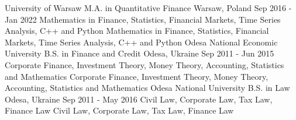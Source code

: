 
\cvexperience
  {University of Warsaw}
  {M.A. in Quantitative Finance}
  {Warsaw, Poland}
  {Sep 2016 - Jan 2022}
  {
    Mathematics in Finance, Statistics, Financial Markets, Time Series Analysis, C++ and Python
  }
  {
    Mathematics in Finance, Statistics, Financial Markets, Time Series Analysis, C++ and Python
  }
\cvexperience
  {Odesa National Economic University}
  {B.S. in Finance and Credit}
  {Odesa, Ukraine}
  {Sep 2011 - Jun 2015}
  {
    Corporate Finance, Investment Theory, Money Theory, Accounting, Statistics and Mathematics
  }
  {
    Corporate Finance, Investment Theory, Money Theory, Accounting, Statistics and Mathematics
  }
\cvexperience
  {Odesa National University}
  {B.S. in Law}
  {Odesa, Ukraine}
  {Sep 2011 - May 2016}
  {
    Civil Law, Corporate Law, Tax Law, Finance Law
  }
  {
    Civil Law, Corporate Law, Tax Law, Finance Law
  }
